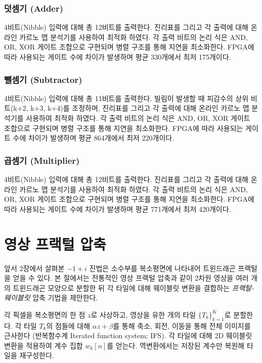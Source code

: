 \documentclass[10pt,a4paper,notitlepage]{report}
\begin{document}
\begin{multicols*}{2}
\subsubsection{덧셈기 (Adder)\cite{Jamil2019}}
4비트(Nibble) 입력에 대해 총 12비트를 출력한다. 진리표를 그리고 각 출력에 대해 온라인 카르노 맵 분석기를 사용하여 최적화 하였다. 각 출력 비트의 논리 식은 AND, OR, XOR 게이트 조합으로 구현되며 병렬 구조를 통해 지연을 최소화한다. FPGA에 따라 사용되는 게이트 수에 차이가 발생하며 평균 330개에서 최저 175개이다.

\subsubsection{뺄셈기 (Subtractor)\cite{Jamil2021Subtractor}}
4비트(Nibble) 입력에 대해 총 11비트를 출력한다. 빌림이 발생할 때 피감수의 상위 비트(k+2, k+3, k+4)를 조정하며, 진리표를 그리고 각 출력에 대해 온라인 카르노 맵 분석기를 사용하여 최적화 하였다. 각 출력 비트의 논리 식은 AND, OR, XOR 게이트 조합으로 구현되며 병렬 구조를 통해 지연을 최소화한다. FPGA에 따라 사용되는 게이트 수에 차이가 발생하며 평균 864개에서 최저 220개이다.

\subsubsection{곱셈기 (Multiplier)\cite{Jamil2021Multiplier}}
4비트(Nibble) 입력에 대해 총 12비트를 출력한다. 진리표를 그리고 각 출력에 대해 온라인 카르노 맵 분석기를 사용하여 최적화 하였다. 각 출력 비트의 논리 식은 AND, OR, XOR 게이트 조합으로 구현되며 병렬 구조를 통해 지연을 최소화한다. FPGA에 따라 사용되는 게이트 수에 차이가 발생하며 평균 771개에서 최저 420개이다.

\section{영상 프랙털 압축}
앞서 2장에서 살펴본 $-1+i$ 진법은 소수부를 복소평면에 나타내어 트윈드래곤 프랙털을 얻을 수 있다. 본 절에서는 전통적인 영상 프랙털 압축과 같이 2차원 영상을 여러 개의 트윈드래곤 모양으로 분할한 뒤 각 타일에 대해 웨이블릿 변환을 결합하는 \emph{프랙탈-웨이블릿} 압축 기법을 제안한다.

각 픽셀을 복소평면의 한 점 $z$로 사상하고, 영상을 유한 개의 타일 $\{T_k\}_{k=1}^K$로 분할한다. 각 타일 $T_k$의 점들에 대해 $\alpha z +\beta$를 통해 축소, 회전, 이동을 통해 전체 이미지를 근사한다 (반복함수계 Iterated function system; IFS). 각 타일에 대해 2D 웨이블릿 변환을 적용하여 계수 집합 $w_{k}[n]$를 얻는다. 역변환에서는 저장된 계수만 복원해 타일을 재구성한다.


\end{multicols*}
\end{document}
